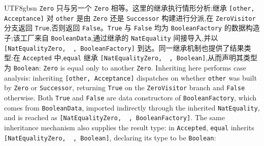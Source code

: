 \begin{CJK*}{UTF8}{gbsn}
\ifPaperChinese
\texttt{Zero} 只与另一个 \texttt{Zero} 相等。这里的继承执行情形分析:继承 \texttt{[other, Acceptance]} 对 \texttt{other} 是由 \texttt{Zero} 还是 \texttt{Successor} 构建进行分派,在 \texttt{ZeroVisitor} 分支返回 \texttt{True},否则返回 \texttt{False}。\texttt{True} 与 \texttt{False} 均为 \texttt{BooleanFactory} 的数据构造子;该工厂来自 \texttt{BooleanData},通过继承的 \texttt{NatEquality} 间接导入,并以 \texttt{[NatEqualityZero, ~, BooleanFactory]} 到达。同一继承机制也提供了结果类型:在 \texttt{Accepted} 中,\texttt{equal} 继承 \texttt{[NatEqualityZero, ~, Boolean]},从而声明其类型为 \texttt{Boolean}:
\else
\texttt{Zero} is equal only to another \texttt{Zero}.
Inheriting here performs case analysis:
inheriting \texttt{[other, Acceptance]} dispatches on whether \texttt{other}
was built by \texttt{Zero} or \texttt{Successor}, returning \texttt{True}
on the \texttt{ZeroVisitor} branch and \texttt{False} otherwise.
Both \texttt{True} and \texttt{False} are data constructors of
\texttt{BooleanFactory}, which comes from \texttt{BooleanData}, imported
indirectly through the inherited \texttt{NatEquality}, and is reached as
\texttt{[NatEqualityZero, ~, BooleanFactory]}.
The same inheritance mechanism also supplies the result type: in
\texttt{Accepted}, \texttt{equal} inherits
\texttt{[NatEqualityZero, ~, Boolean]}, declaring its type to
be \texttt{Boolean}:
\fi
{}


\end{CJK*}
